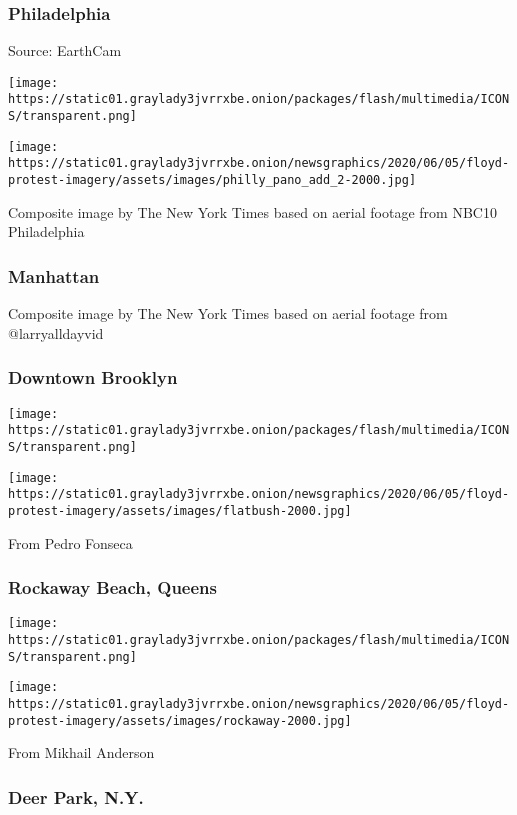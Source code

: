 \hypertarget{philadelphia}{%
\subsubsection{Philadelphia}\label{philadelphia}}

Source: EarthCam

\texttt{[image: https://static01.graylady3jvrrxbe.onion/packages/flash/multimedia/ICONS/transparent.png]}

\texttt{[image: https://static01.graylady3jvrrxbe.onion/newsgraphics/2020/06/05/floyd-protest-imagery/assets/images/philly\_pano\_add\_2-2000.jpg]}

Composite image by The New York Times based on aerial footage from NBC10
Philadelphia

\hypertarget{manhattan}{%
\subsubsection{Manhattan}\label{manhattan}}

Composite image by The New York Times based on aerial footage from
@larryalldayvid

\hypertarget{downtown-brooklyn}{%
\subsubsection{Downtown Brooklyn}\label{downtown-brooklyn}}

\texttt{[image: https://static01.graylady3jvrrxbe.onion/packages/flash/multimedia/ICONS/transparent.png]}

\texttt{[image: https://static01.graylady3jvrrxbe.onion/newsgraphics/2020/06/05/floyd-protest-imagery/assets/images/flatbush-2000.jpg]}

From Pedro Fonseca

\hypertarget{rockaway-beach-queens}{%
\subsubsection{Rockaway Beach, Queens}\label{rockaway-beach-queens}}

\texttt{[image: https://static01.graylady3jvrrxbe.onion/packages/flash/multimedia/ICONS/transparent.png]}

\texttt{[image: https://static01.graylady3jvrrxbe.onion/newsgraphics/2020/06/05/floyd-protest-imagery/assets/images/rockaway-2000.jpg]}

From Mikhail Anderson

\hypertarget{deer-park-ny}{%
\subsubsection{Deer Park, N.Y.}\label{deer-park-ny}}

